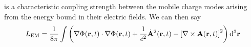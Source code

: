 \documentclass{article}
\begin{document}
is a characteristic coupling strength between the mobile charge modes arising from the energy bound in their electric fields. We can then say
\begin{equation}
\begin{split}
L_\mathrm{EM} &= \frac{1}{8\pi}\int\left( \vphantom{\frac{1}{c^2}} \nabla\Phi(\mathbf{r},t)\cdot\nabla\Phi(\mathbf{r},t) + \frac{1}{c^2}\dot{\mathbf{A}}^2(\mathbf{r},t) - \left[\nabla\times\mathbf{A}(\mathbf{r},t)\right]^2\right)\mathrm{d}^3\mathbf{r}\\

\end{split}
\end{equation}
\end{document}
